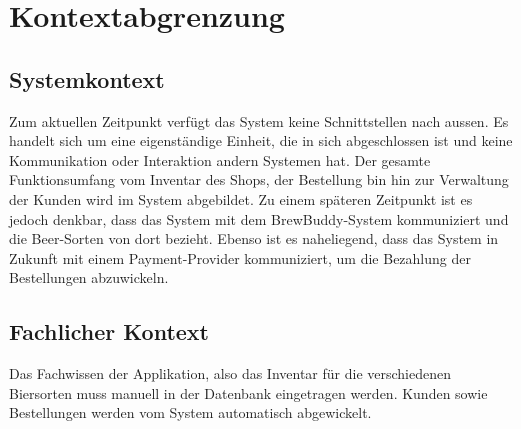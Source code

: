 
\section{Kontextabgrenzung}
\label{sec:kontextabgrenzung}

\subsection{Systemkontext}
\label{subsec:systemkontext}
Zum aktuellen Zeitpunkt verfügt das System keine Schnittstellen nach aussen. Es handelt sich um eine eigenständige Einheit, die in sich abgeschlossen ist und keine Kommunikation oder Interaktion andern Systemen hat. Der gesamte Funktionsumfang vom Inventar des Shops, der Bestellung bin hin zur Verwaltung der Kunden wird im System abgebildet.
Zu einem späteren Zeitpunkt ist es jedoch denkbar, dass das System mit dem BrewBuddy-System kommuniziert und die Beer-Sorten von dort bezieht. Ebenso ist es naheliegend, dass das System in Zukunft mit einem Payment-Provider kommuniziert, um die Bezahlung der Bestellungen abzuwickeln.

\subsection{Fachlicher Kontext}
\label{subsec:fachlicherkontext}
Das Fachwissen der Applikation, also das Inventar für die verschiedenen Biersorten muss manuell in der Datenbank eingetragen werden. Kunden sowie Bestellungen werden vom System automatisch abgewickelt.